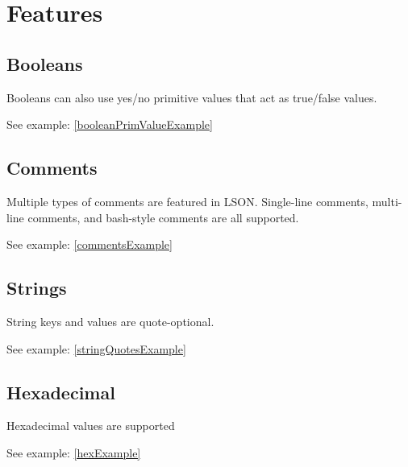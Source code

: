 \documentclass[12pt]{article}
\begin{document}
\newpage

\section{Features}
\subsection{Booleans}
Booleans can also use yes/no primitive values that act as true/false values.

See example: \ref{booleanPrimValueExample}

\subsection{Comments}
Multiple types of comments are featured in LSON. Single-line comments, multi-line comments, and bash-style comments are all supported.

See example: \ref{commentsExample}

\subsection{Strings}
String keys and values are quote-optional.

See example: \ref{stringQuotesExample}

\subsection{Hexadecimal}
Hexadecimal values are supported

See example: \ref{hexExample}
\end{document}
